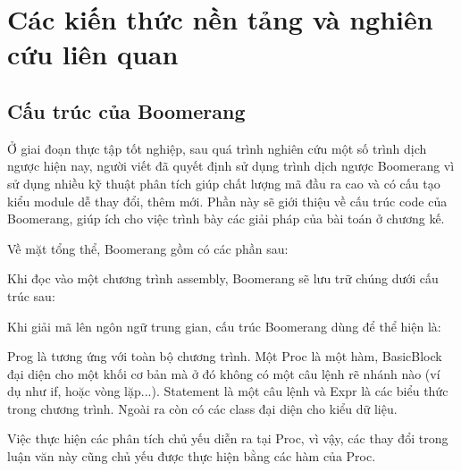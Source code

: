 \section{Các kiến thức nền tảng và nghiên cứu liên quan}
\subsection{Cấu trúc của Boomerang}
Ở giai đoạn thực tập tốt nghiệp, sau quá trình nghiên cứu một số trình dịch ngược hiện nay, người viết đã quyết định sử dụng trình dịch ngược Boomerang vì sử dụng nhiều kỹ thuật phân tích giúp chất lượng mã đầu ra cao và có cấu tạo kiểu module dễ thay đổi, thêm mới. Phần này sẽ giới thiệu về cấu trúc code của Boomerang, giúp ích cho việc trình bày các giải pháp của bài toán ở chương kế.

Về mặt tổng thể, Boomerang gồm có các phần sau:

Khi đọc vào một chương trình assembly, Boomerang sẽ lưu trữ chúng dưới cấu trúc sau:


Khi giải mã lên ngôn ngữ trung gian, cấu trúc Boomerang dùng để thể hiện là:


Prog là tương ứng với toàn bộ chương trình. Một Proc là một hàm, BasicBlock đại diện cho một khối cơ bản mà ở đó không có một câu lệnh rẽ nhánh nào (ví dụ như if, hoặc vòng lặp...). Statement là một câu lệnh và Expr là các biểu thức trong chương trình. Ngoài ra còn có các class đại diện cho kiểu dữ liệu.

Việc thực hiện các phân tích chủ yếu diễn ra tại Proc, vì vậy, các thay đổi trong luận văn này cũng chủ yếu được thực hiện bằng các hàm của Proc.